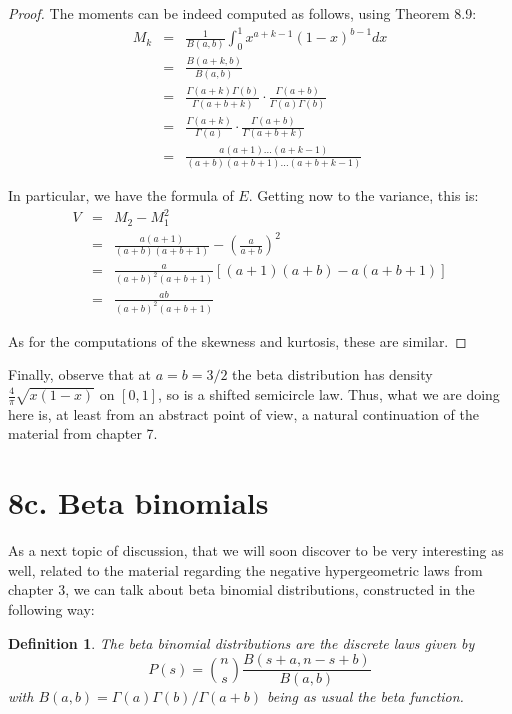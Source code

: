 \documentclass[12pt]{amsbook}
\newtheorem{definition}[theorem]{Definition}
\begin{document}
\begin{proof}
The moments can be indeed computed as follows, using Theorem 8.9:
\begin{eqnarray*}
M_k
&=&\frac{1}{B(a,b)}\int_0^1x^{a+k-1}(1-x)^{b-1}dx\\
&=&\frac{B(a+k,b)}{B(a,b)}\\
&=&\frac{\Gamma(a+k)\Gamma(b)}{\Gamma(a+b+k)}\cdot\frac{\Gamma(a+b)}{\Gamma(a)\Gamma(b)}\\
&=&\frac{\Gamma(a+k)}{\Gamma(a)}\cdot\frac{\Gamma(a+b)}{\Gamma(a+b+k)}\\
&=&\frac{a(a+1)\ldots(a+k-1)}{(a+b)(a+b+1)\ldots(a+b+k-1)}
\end{eqnarray*}

In particular, we have the formula of $E$. Getting now to the variance, this is:
\begin{eqnarray*}
V
&=&M_2-M_1^2\\
&=&\frac{a(a+1)}{(a+b)(a+b+1)}-\left(\frac{a}{a+b}\right)^2\\
&=&\frac{a}{(a+b)^2(a+b+1)}[(a+1)(a+b)-a(a+b+1)]\\
&=&\frac{ab}{(a+b)^2(a+b+1)}
\end{eqnarray*}

As for the computations of the skewness and kurtosis, these are similar.
\end{proof}

Finally, observe that at $a=b=3/2$ the beta distribution has density $\frac{4}{\pi}\sqrt{x(1-x)}$ on $[0,1]$, so is a shifted semicircle law. Thus, what we are doing here is, at least from an abstract point of view, a natural continuation of the material from chapter 7.

\section*{8c. Beta binomials}

As a next topic of discussion, that we will soon discover to be very interesting as well, related to the material regarding the negative hypergeometric laws from chapter 3, we can talk about beta binomial distributions, constructed in the following way:


\begin{definition}
The beta binomial distributions are the discrete laws given by
$$P(s)=\binom{n}{s}\frac{B(s+a,n-s+b)}{B(a,b)}$$
with $B(a,b)=\Gamma(a)\Gamma(b)/\Gamma(a+b)$ being as usual the beta function.
\end{definition}
\end{document}

